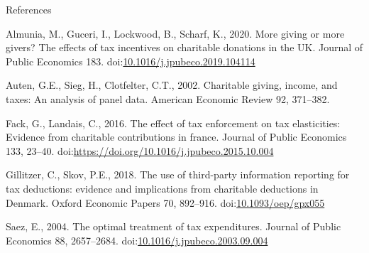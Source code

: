 \documentclass[
  ignorenonframetext,
  aspectratio=169,
]{beamer}
\newlength{\cslhangindent}
\newlength{\cslentryspacingunit} %
\newenvironment{CSLReferences}[2] %
 {%
  \setlength{\parindent}{0pt}
  \ifodd #1
  \let\oldpar\par
  \def\par{\hangindent=\cslhangindent\oldpar}
  \fi
  \setlength{\parskip}{#2\cslentryspacingunit}
 }%
 {}
\begin{document}
\begin{frame}{References}
\hypertarget{refs}{}
\begin{CSLReferences}{1}{0}
\leavevmode{}%
Almunia, M., Guceri, I., Lockwood, B., Scharf, K., 2020. More giving or more givers? The effects of tax incentives on charitable donations in the UK. Journal of Public Economics 183. doi:\href{https://doi.org/10.1016/j.jpubeco.2019.104114}{10.1016/j.jpubeco.2019.104114}

\leavevmode{}%
Auten, G.E., Sieg, H., Clotfelter, C.T., 2002. Charitable giving, income, and taxes: An analysis of panel data. American Economic Review 92, 371--382.

\leavevmode{}%
Fack, G., Landais, C., 2016. The effect of tax enforcement on tax elasticities: Evidence from charitable contributions in france. Journal of Public Economics 133, 23--40. doi:\url{https://doi.org/10.1016/j.jpubeco.2015.10.004}

\leavevmode{}%
Gillitzer, C., Skov, P.E., 2018. {The use of third-party information reporting for tax deductions: evidence and implications from charitable deductions in Denmark}. Oxford Economic Papers 70, 892--916. doi:\href{https://doi.org/10.1093/oep/gpx055}{10.1093/oep/gpx055}

\leavevmode{}%
Saez, E., 2004. The optimal treatment of tax expenditures. Journal of Public Economics 88, 2657--2684. doi:\href{https://doi.org/10.1016/j.jpubeco.2003.09.004}{10.1016/j.jpubeco.2003.09.004}

\end{CSLReferences}
\end{frame}
\end{document}
